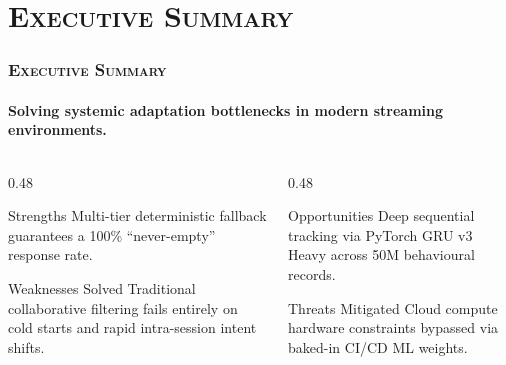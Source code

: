 \documentclass[aspectratio=169,10pt]{beamer}
\begin{document}
\section{\textsc{Executive Summary}}
\begin{frame}
  \frametitle{\textsc{Executive Summary}}
  \framesubtitle{Solving systemic adaptation bottlenecks in modern streaming environments.}

  \vspace{-2mm}
  \begin{columns}[T]
    \begin{column}{0.48\textwidth}
      \begin{block}{Strengths}
        \fontsize{7pt}{9pt}\selectfont
        Multi-tier deterministic fallback guarantees a 100\% ``never-empty'' response rate.
      \end{block}
      \begin{alertblock}{Weaknesses Solved}
        \fontsize{7pt}{9pt}\selectfont
        Traditional collaborative filtering fails entirely on cold starts and rapid intra-session intent shifts.
      \end{alertblock}
    \end{column}
    \begin{column}{0.48\textwidth}
      \begin{block}{Opportunities}
        \fontsize{7pt}{9pt}\selectfont
        Deep sequential tracking via PyTorch GRU v3 Heavy across 50M behavioural records.
      \end{block}
      \begin{exampleblock}{Threats Mitigated}
        \fontsize{7pt}{9pt}\selectfont
        Cloud compute hardware constraints bypassed via baked-in CI/CD ML weights.
      \end{exampleblock}
    \end{column}
  \end{columns}
\end{frame}

\end{document}
